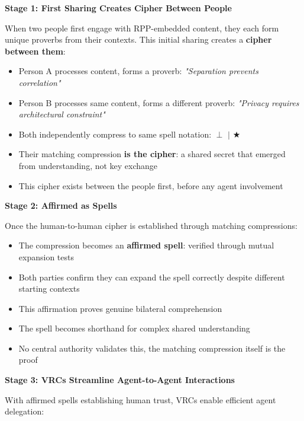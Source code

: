 \documentclass[11pt,a4paper]{article}
\theoremstyle{definition}
\begin{document}
\textbf{Stage 1: First Sharing Creates Cipher Between People}

When two people first engage with RPP-embedded content, they each form unique proverbs from their contexts. This initial sharing creates a \textbf{cipher between them}:

\begin{itemize}
    \item Person A processes content, forms a proverb: \textit{"Separation prevents correlation"}
    \item Person B processes same content, forms a different proverb: \textit{"Privacy requires architectural constraint"}
    \item Both independently compress to same spell notation: $\perp$ $|$ $\bigstar$
    \item Their matching compression \textbf{is the cipher}: a shared secret that emerged from understanding, not key exchange
    \item This cipher exists between the people first, before any agent involvement
\end{itemize}

\textbf{Stage 2: Affirmed as Spells}

Once the human-to-human cipher is established through matching compressions:

\begin{itemize}
    \item The compression becomes an \textbf{affirmed spell}: verified through mutual expansion tests
    \item Both parties confirm they can expand the spell correctly despite different starting contexts
    \item This affirmation proves genuine bilateral comprehension
    \item The spell becomes shorthand for complex shared understanding
    \item No central authority validates this, the matching compression itself is the proof
\end{itemize}

\textbf{Stage 3: VRCs Streamline Agent-to-Agent Interactions}

With affirmed spells establishing human trust, VRCs enable efficient agent delegation:
\end{document}
